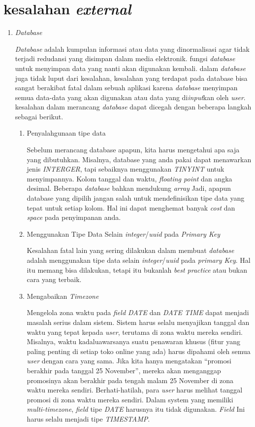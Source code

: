 \section{kesalahan \textit{external}}
\begin{enumerate}
\item \textit{Database}
\par
\textit{Database} adalah kumpulan informasi atau data yang dinormalisasi agar tidak terjadi redudansi yang disimpan dalam media elektronik. fungsi \textit{database} untuk menyimpan data yang nanti akan digunakan kembali. dalam \textit{database} juga tidak luput dari kesalahan, kesalahan yang terdapat pada database bisa sangat berakibat fatal dalam sebuah aplikasi karena \textit{database} menyimpan semua data-data yang akan digunakan atau data yang di\textit{input}kan oleh \textit{user}. kesalahan dalam merancang \textit{database} dapat dicegah dengan beberapa langkah sebagai berikut.
\begin{enumerate}
\item Penyalahgunaan tipe data
\par 
Sebelum merancang database apapun, kita harus mengetahui apa saja yang dibutuhkan. Misalnya, database yang anda pakai dapat menawarkan jenis \textit{INTERGER}, tapi sebaiknya menggunakan \textit{TINYINT} untuk menyimpannya. Kolom tanggal dan waktu, \textit{floating point} dan angka desimal. Beberapa \textit{database} bahkan mendukung \textit{array} Jadi, apapun database yang dipilih jangan salah  untuk mendefinisikan tipe data yang tepat untuk setiap kolom. Hal ini dapat menghemat banyak \textit{cost} dan \textit{space} pada penyimpanan anda.
\item Menggunakan Tipe Data Selain \textit{integer}/\textit{uuid} pada \textit{Primary Key} 
\par
Kesalahan fatal lain yang sering dilakukan dalam membuat \textit{database} adalah menggunakan tipe data selain \textit{integer}/\textit{uuid} pada \textit{primary Key}. Hal itu memang bisa dilakukan, tetapi itu bukanlah \textit{best practice} atau bukan cara yang terbaik.
\item Mengabaikan \textit{Timezone}
\par 
Mengelola zona waktu pada \textit{field DATE} dan \textit{DATE TIME} dapat menjadi masalah serius dalam sistem. Sistem harus selalu menyajikan tanggal dan waktu yang tepat kepada \textit{user}, terutama di zona waktu mereka sendiri. Misalnya, waktu kadaluawarsanya suatu penawaran khusus (fitur yang paling penting di setiap toko online yang ada) harus dipahami oleh semua \textit{user} dengan cara yang sama. Jika kita hanya mengatakan “promosi berakhir pada tanggal 25 November”, mereka akan menganggap promosinya akan berakhir pada tengah malam 25 November di zona waktu mereka sendiri. Berhati-hatilah, para \textit{user} harus melihat tanggal promosi di zona waktu mereka sendiri. Dalam system yang memiliki \textit{multi-timezone}, \textit{field} tipe \textit{DATE} harusnya itu tidak digunakan. \textit{Field} Ini harus selalu menjadi tipe \textit{TIMESTAMP}.

\end{enumerate}
\end{enumerate}
